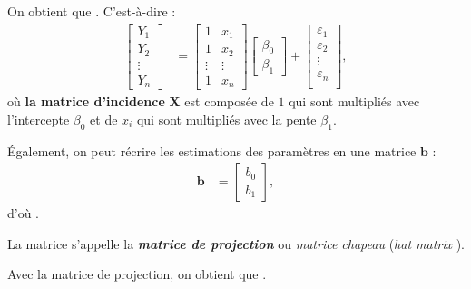 \documentclass[french]{article}
\begin{document}
\begin{multicols*}{2}
On obtient que . C'est-à-dire :
\begin{align*}
	\begin{bmatrix}
		Y_{1}	\\
		Y_{2}	\\
		\vdots	\\
		Y_{n}
	\end{bmatrix}
	&=	
	\begin{bmatrix}
		1	&	x_{1}	\\
		1	&	x_{2}	\\
		\vdots	&	\vdots	\\
		1	&	x_{n}
	\end{bmatrix}
	\begin{bmatrix}
		\beta_{0}	\\
		\beta_{1}
	\end{bmatrix} + 
	\begin{bmatrix}
		\varepsilon_{1}	\\
		\varepsilon_{2}	\\
		\vdots	\\
		\varepsilon_{n}	\\
	\end{bmatrix},
\end{align*}
où \textbf{la matrice d'incidence} $\bm{X}$ est composée de $1$ qui sont multipliés avec l'intercepte $\beta_{0}$ et de $x_{i}$ qui sont multipliés avec la pente $\beta_{1}$.

\bigskip

Également, on peut récrire les estimations des paramètres en une matrice $\bm{b}$ :
\begin{align*}
	\bm{b}
	&=	\begin{bmatrix}
		b_{0}	\\
		b_{1}
	\end{bmatrix},
\end{align*}
d'où . 

\bigskip

\begin{definitionNOHFILL}
La matrice  s'appelle la \textbf{\textit{matrice de projection}} ou \textit{matrice chapeau} (\og \textit{hat matrix} \fg{}).

\bigskip

Avec la matrice de projection, on obtient que . 


\end{definitionNOHFILL}
\end{multicols*}
\end{document}
